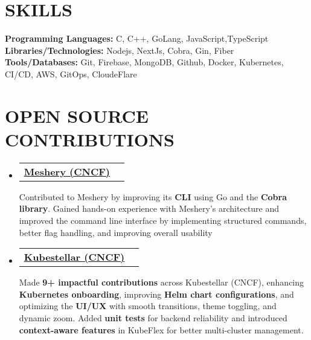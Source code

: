 \documentclass[letterpaper,11pt]{article}
\makeatletter
\newcommand{\resumeItem}[1]{
  \item\small{
    {#1 \vspace{-2pt}}
  }
}
\newcommand{\resumeProjectHeading}[2]{
    \item
    \begin{tabular*}{1.001\textwidth}{l@{\extracolsep{\fill}}r}
      \small#1 & \textbf{\small #2}\\
    \end{tabular*}\vspace{-7pt}
}
\newcommand{\resumeSubHeadingListStart}{\begin{itemize}[leftmargin=0.0in, label={}]}
\newcommand{\resumeItemListEnd}{\end{itemize}\vspace{-5pt}}
\makeatother
\begin{document}
%
\section{SKILLS}
 \begin{itemize}[leftmargin=0.15in, label={}]
    \small{\item{
     \textbf{\normalsize{Programming Languages:}}{ \normalsize{C, C++, GoLang, JavaScript,TypeScript}} \\
     \textbf{\normalsize{Libraries/Technologies:}}{\normalsize{ Nodejs, NextJs, Cobra, Gin, Fiber}}
     \\
     \textbf{\normalsize{Tools/Databases:}}{\normalsize{ Git, Firebase, MongoDB, Github, Docker, Kubernetes, CI/CD, AWS, GitOps, CloudeFlare}}
    }}
 \end{itemize}
 \vspace{-13pt}
\section{OPEN SOURCE CONTRIBUTIONS}
\vspace{-5pt}
\resumeSubHeadingListStart


\resumeProjectHeading
{\href{https://github.com/meshery/meshery}{\textbf{\large{\underline{Meshery (CNCF)}}}} 
\href{https://gist.github.com/Arpit529Srivastava/7f690bca6f7bc55bbc7b2f53d274bc02}{\raisebox{-0.1\height}\faExternalLink}}

\resumeItem{\normalsize{Contributed to Meshery by improving its \textbf{CLI} using Go and the \textbf{Cobra library}. Gained hands-on experience with Meshery's architecture and improved the command line interface by implementing structured commands, better flag handling, and improving overall usability}}

\vspace{-12pt}

\resumeProjectHeading
{\href{https://github.com/kubestellar}{\textbf{\large\underline{Kubestellar (CNCF)}}} 
\href{https://gist.github.com/Arpit529Srivastava/0aac65ec10eb5fe47b015e465019f4c5}{\raisebox{-0.1\height}{\faExternalLink}}}

\resumeItem{\normalsize{Made \textbf{9+ impactful contributions} across Kubestellar (CNCF), enhancing \textbf{Kubernetes onboarding}, improving \textbf{Helm chart configurations}, and optimizing the \textbf{UI/UX} with smooth transitions, theme toggling, and dynamic zoom. Added \textbf{unit tests} for backend reliability and introduced \textbf{context-aware features} in KubeFlex for better multi-cluster management.}}
\resumeItemListEnd
\vspace{-11pt} %
\end{document}
